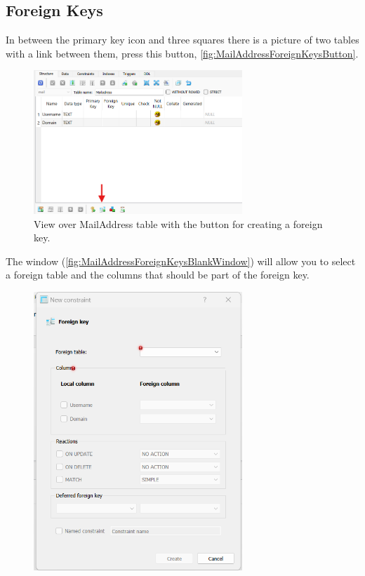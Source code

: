 \documentclass[a4paper,11pt,oneside]{article}
\begin{document}
\begin{sloppypar}
\subsection{Foreign Keys}
\label{sqliteStudioForeignKeys}
In between the primary key icon and three squares there is a picture of two tables with a link between them, press this button, \autoref{fig:MailAddressForeignKeysButton}.
\begin{figure}[!htb]
  \centering
  \includegraphics[width=0.7\textwidth]{sqlitestudio/create_foreign_key/foreign_key_button_location.png}
  \caption{View over MailAddress table with the button for creating a foreign key.}
  \label{fig:MailAddressForeignKeysButton}
\end{figure}
The window (\autoref{fig:MailAddressForeignKeysBlankWindow}) will allow you to select a foreign table and the columns that should be part of the foreign key.
\begin{figure}[!htb]
  \centering
  \includegraphics[width=0.7\textwidth]{sqlitestudio/create_foreign_key/foreign_key_blank.png}

\end{figure}
\end{sloppypar}
\end{document}
